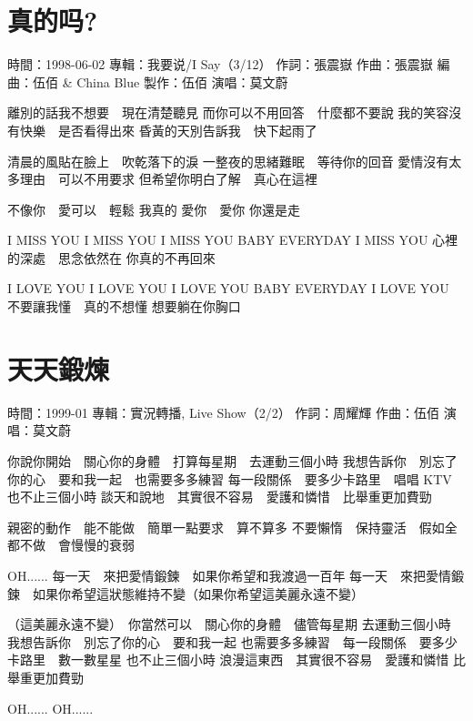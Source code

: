 \documentclass[UTF8,a4paper,oneside,twocolumn,12pt]{ctexbook}
\newcommand{\infopair}[2]{\textbullet #1：#2}
\newcommand{\zc}[1][伍佰]{\infopair{作詞}{#1}}
\newcommand{\zq}[1][伍佰]{\infopair{作曲}{#1}}
\newcommand{\bq}[1][伍佰]{\infopair{編曲}{#1}}
\newcommand{\zj}[1]{\infopair{專輯}{#1}}
\newcommand{\zz}[1]{\infopair{製作}{#1}}
\newcommand{\sj}[1]{\infopair{時間}{#1}}
\newenvironment{info}{\begin{flushleft}\kaishu
	}
	{\end{flushleft}\normalsize\yahei\par}
\newenvironment{lyric}{
	}
{}
\begin{document}
\section{真的吗?}
\begin{info}
	\sj{1998-06-02}
	\zj{我要说/I Say（3/12）}
	\zc[張震嶽]
	\zq[張震嶽]
	\bq[伍佰 \& China Blue]
	\zz{伍佰}
	\infopair{演唱}{莫文蔚}
\end{info}
\begin{lyric}
	離別的話我不想要　現在清楚聽見
	而你可以不用回答　什麼都不要說
	我的笑容沒有快樂　是否看得出來
	昏黃的天別告訴我　快下起雨了

	清晨的風貼在臉上　吹乾落下的淚
	一整夜的思緒難眠　等待你的回音
	愛情沒有太多理由　可以不用要求
	但希望你明白了解　真心在這裡

	不像你　愛可以　輕鬆
	我真的 愛你　愛你  你還是走

	I MISS YOU  I MISS YOU  I MISS YOU
	BABY EVERYDAY I MISS YOU
	心裡的深處　思念依然在  你真的不再回來

	I LOVE YOU  I LOVE YOU  I LOVE YOU
	BABY EVERYDAY I LOVE YOU
	不要讓我懂　真的不想懂  想要躺在你胸口
\end{lyric}

\section{天天鍛煉}
\begin{info}
	\sj{1999-01}
	\zj{實況轉播, Live Show（2/2）}
	\zc[周耀輝]
	\zq
	\infopair{演唱}{莫文蔚}
\end{info}
\begin{lyric}
	你說你開始　關心你的身體　打算每星期　去運動三個小時
	我想告訴你　別忘了你的心　要和我一起　也需要多多練習
	每一段關係　要多少卡路里　唱唱 KTV  也不止三個小時
	談天和說地　其實很不容易　愛護和憐惜　比舉重更加費勁

	親密的動作　能不能做　簡單一點要求　算不算多
	不要懶惰　保持靈活　假如全都不做　會慢慢的衰弱

	OH...... 每一天　來把愛情鍛鍊　如果你希望和我渡過一百年
	每一天　來把愛情鍛鍊　如果你希望這狀態維持不變（如果你希望這美麗永遠不變）

	（這美麗永遠不變）　你當然可以　關心你的身體　儘管每星期
	去運動三個小時　我想告訴你　別忘了你的心　要和我一起
	也需要多多練習　每一段關係　要多少卡路里　數一數星星
	也不止三個小時  浪漫這東西　其實很不容易　愛護和憐惜
	比舉重更加費勁

	OH......  OH......
\end{lyric}
\end{document}
